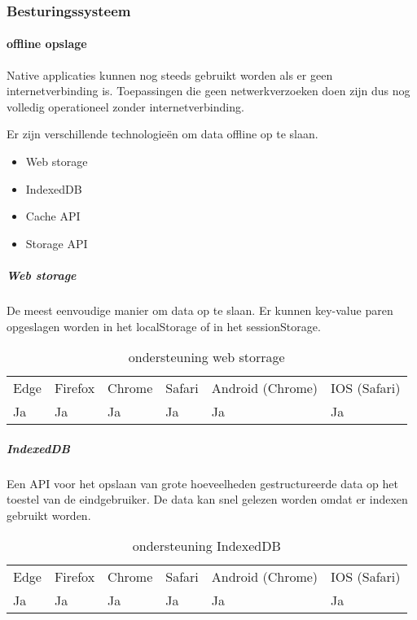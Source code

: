 \subsubsection{Besturingssysteem}
\paragraph{offline opslage}
Native applicaties kunnen nog steeds gebruikt worden als er geen internetverbinding is. Toepassingen die geen netwerkverzoeken doen zijn dus nog volledig operationeel zonder internetverbinding. 

Er zijn verschillende technologieën om data offline op te slaan. 

 \begin{itemize}
	\item	Web storage
	\item	IndexedDB
	\item	Cache API
	\item	Storage API
\end{itemize}

	\subparagraph{Web storage}
	De meest eenvoudige manier om data op te slaan. Er kunnen key-value paren opgeslagen worden in het localStorage of in het sessionStorage. 
	\autocite{Hickson2020}
	
	\begin{table}[]
		\begin{tabular}{llllll}
			Edge & Firefox & Chrome & Safari & Android (Chrome) & IOS (Safari) \\
			Ja   & Ja      &  Ja     & Ja     & Ja               & Ja          
		\end{tabular}	
		\caption{ondersteuning web storrage }
		\label{ondersteuning web storrage}
	\end{table}
	
	
	
	\subparagraph{IndexedDB}
	Een API voor het opslaan van grote hoeveelheden gestructureerde data op het toestel van de eindgebruiker. De data kan snel gelezen worden omdat er indexen gebruikt worden. 
	\autocite{Alabbas2020}
	
	\begin{table}[]
			\begin{tabular}{llllll}
				Edge & Firefox & Chrome & Safari & Android (Chrome) & IOS (Safari) \\
				Ja   & Ja      &  Ja     & Ja     & Ja               & Ja          
			\end{tabular}	
			\caption{ondersteuning IndexedDB}
			\label{ondersteuning IndexedDB}
	\end{table}
	
